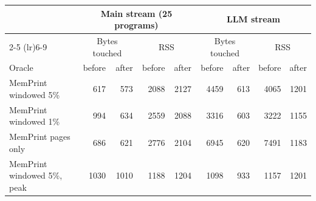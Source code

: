 \begin{tabular}{lrrrrrrrr}
\toprule
 & \multicolumn{4}{c}{Main stream (25 programs)} & \multicolumn{4}{c}{LLM stream} \\
\cmidrule(lr){2-5} \cmidrule(lr){6-9}
 & \multicolumn{2}{c}{Bytes touched} & \multicolumn{2}{c}{RSS} & \multicolumn{2}{c}{Bytes touched} & \multicolumn{2}{c}{RSS} \\
Oracle & before & after & before & after & before & after & before & after \\
\midrule
MemPrint windowed 5\% & 617 & 573 & 2088 & 2127 & 4459 & 613 & 4065 & 1201 \\
MemPrint windowed 1\% & 994 & 634 & 2559 & 2088 & 3316 & 603 & 3222 & 1155 \\
MemPrint pages only & 686 & 621 & 2776 & 2104 & 6945 & 620 & 7491 & 1183 \\
MemPrint windowed 5\%, peak & 1030 & 1010 & 1188 & 1204 & 1098 & 933 & 1157 & 1201 \\
\bottomrule
\end{tabular}

